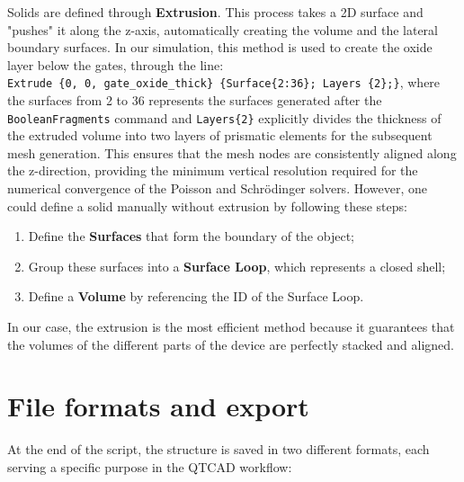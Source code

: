 Solids are defined through \textbf{Extrusion}. This process takes a 2D surface and "pushes" it along the z-axis, automatically creating the volume and the lateral boundary surfaces.
In our simulation, this method is used to create the oxide layer below the gates, through the line:\\ \texttt{Extrude \{0, 0, gate\_oxide\_thick\} \{Surface\{2:36\}; Layers \{2\};\}}, where the surfaces from 2 to 36 represents the surfaces generated after the \texttt{BooleanFragments} command and \texttt{Layers\{2\}}  explicitly divides the thickness of the extruded volume into two layers of prismatic elements for the subsequent mesh generation. This ensures that the mesh nodes are consistently aligned along the z-direction, providing the minimum vertical resolution required for the numerical convergence of the Poisson and Schrödinger solvers.
However, one could define a solid manually without extrusion by following these steps:
\begin{enumerate}
    \item Define the \textbf{Surfaces} that form the boundary of the object;
    \item Group these surfaces into a \textbf{Surface Loop}, which represents a closed shell;
    \item Define a \textbf{Volume} by referencing the ID of the Surface Loop.
\end{enumerate}
In our case, the extrusion is the most efficient method because it guarantees that the volumes of the different parts of the device are perfectly stacked and aligned.

\section{File formats and export}
At the end of the script, the structure is saved in two different formats, each serving a specific purpose in the QTCAD workflow:

